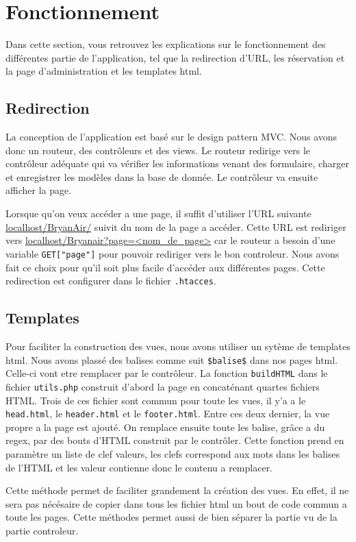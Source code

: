 \documentclass[12pt,a4paper]{article}
\begin{document}
	\section{Fonctionnement}
		Dans cette section, vous retrouvez les explications sur le fonctionnement des différentes partie de l'application, tel que la redirection d'URL, les réservation et la page d'administration et les templates html.
		\subsection*{Redirection}
		La conception de l'application est basé sur le design pattern MVC. Nous avons donc un routeur, des contrôleurs et des views. Le routeur redirige vers le contrôleur adéquate qui va vérifier les informations venant des formulaire, charger et enregistrer les modèles dans la base de donnée. Le contrôleur va ensuite afficher la page.

		Lorsque qu'on veux accéder a une page, il suffit d'utiliser l'URL suivante \url{localhost/BryanAir/} suivit du nom de la page a accéder. Cette URL est rediriger vers \url{localhost/Bryanair?page=<nom_de_page>} car le routeur a besoin d'une variable \texttt{GET["page"]} pour pouvoir rediriger vers le bon controleur. Nous avons fait ce choix pour qu'il soit plus facile d'accéder aux différentes pages. Cette redirection est configurer dans le fichier \texttt{.htacces}.

		\subsection*{Templates}
		Pour faciliter la construction des vues, nous avons utiliser un sytème de templates html. Nous avons plassé des balises comme suit \texttt{\$balise\$} dans nos pages html. Celle-ci vont etre remplacer par le contrôleur. La fonction \texttt{buildHTML} dans le fichier \texttt{utils.php} construit d'abord la page en concaténant quartes fichiers HTML. Trois de ces fichier sont commun pour toute les vues, il y'a a le \texttt{head.html}, le \texttt{header.html} et le \texttt{footer.html}.  Entre ces deux dernier, la vue propre a la page est ajouté.
		On remplace ensuite toute les balise, grâce a du regex, par des bouts d'HTML construit par le contrôler. Cette fonction prend en paramètre un liste de clef valeurs, les clefs correspond aux mots dans les balises de l'HTML et les valeur contienne donc le contenu a remplacer.

		Cette méthode permet de faciliter grandement la création des vues. En effet, il ne sera pas nécésaire de copier dans tous les fichier html un bout de code commun a toute les pages. Cette méthodes permet aussi de bien séparer la partie vu de la partie controleur.
\end{document}
